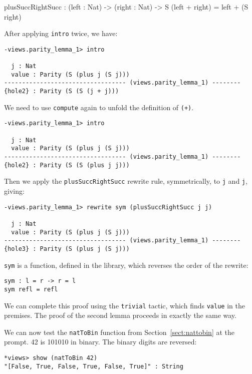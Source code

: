 \begin{code}
plusSuccRightSucc : (left : Nat) -> (right : Nat) ->
  S (left + right) = left + (S right)
\end{code}

\noindent
After applying \texttt{intro} twice, we have:

\begin{lstlisting}
-views.parity_lemma_1> intro 

  j : Nat
  value : Parity (S (plus j (S j)))
---------------------------------- (views.parity_lemma_1) --------
{hole2} : Parity (S (S (j + j)))
\end{lstlisting}

\noindent
We need to use \texttt{compute} again to unfold the definition of \texttt{(+)}.

\begin{lstlisting}
-views.parity_lemma_1> intro 

  j : Nat
  value : Parity (S (plus j (S j)))
---------------------------------- (views.parity_lemma_1) --------
{hole2} : Parity (S (S (plus j j)))
\end{lstlisting}

\noindent
Then we apply the \texttt{plusSuccRightSucc} rewrite rule, symmetrically, to \texttt{j} and \texttt{j}, giving:

\begin{lstlisting}
-views.parity_lemma_1> rewrite sym (plusSuccRightSucc j j) 
 
  j : Nat
  value : Parity (S (plus j (S j)))
---------------------------------- (views.parity_lemma_1) --------
{hole3} : Parity (S (plus j (S j)))
\end{lstlisting}

\noindent
\texttt{sym} is a function, defined in the library, which reverses the order of the rewrite:

\begin{lstlisting}
sym : l = r -> r = l
sym refl = refl
\end{lstlisting} 

\noindent
We can complete this proof using the \texttt{trivial} tactic, which finds  \texttt{value} in the premises.
The proof of the second lemma proceeds in exactly the same way.

We can now test the \texttt{natToBin} function from Section~\ref{sect:nattobin} at the prompt.
42 is 101010 in binary.
The binary digits are reversed:

\begin{lstlisting}
*views> show (natToBin 42)
"[False, True, False, True, False, True]" : String
\end{lstlisting}



